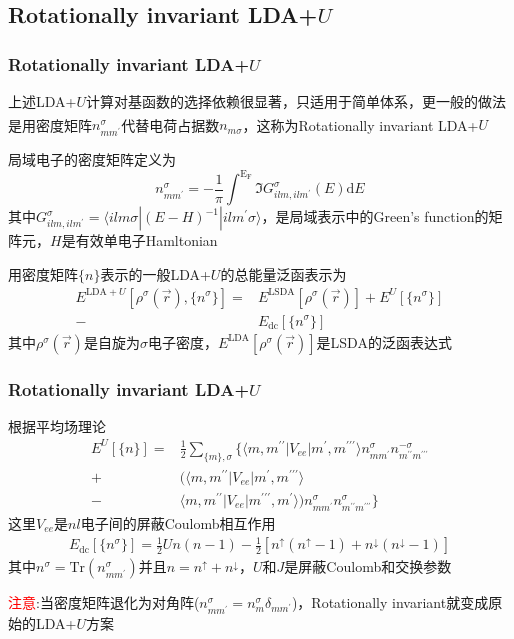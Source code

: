 \documentclass[cjk,slidestop,compress,mathserif,blue]{beamer}
\newcommand{\upcite}[1]{\hspace{0ex}\textsuperscript{\cite{#1}}} %
\begin{document}
\subsection{\rm{Rotationally invariant LDA+}$U$}
\frame
{
	\frametitle{\textrm{Rotationally invariant LDA+}$U$}
	上述\textrm{LDA}+$U$计算对基函数的选择依赖很显著，只适用于简单体系，更一般的做法是用密度矩阵$n_{mm^{\prime}}^{\sigma}$代替电荷占据数$n_{m\sigma}$，这称为\textrm{Rotationally invariant LDA}+$U$\upcite{PRB52-R5467_1995}

局域电子的密度矩阵定义为
\begin{displaymath}
	n_{mm^{\prime}}^{\sigma}=-\frac1{\pi}\int^{\mathrm{E_F}}\Im G_{ilm,ilm^{\prime}}^{\sigma}(E)\mathrm{d}E
\end{displaymath}
其中$G_{ilm,ilm^{\prime}}^{\sigma}=\langle ilm\sigma|(E-H)^{-1}|ilm^{\prime}\sigma\rangle$，是局域表示中的\textrm{Green's function}的矩阵元，$H$是有效单电子\textrm{Hamltonian}

用密度矩阵$\{n\}$表示的一般\textrm{LDA+}$U$的总能量泛函表示为
\begin{displaymath}
	\begin{aligned}
		E^{\mathrm{LDA}+U}[\rho^{\sigma}(\vec r),\{n^{\sigma}\}]=&E^{\mathrm{LSDA}}[\rho^{\sigma}(\vec r)]+E^U[\{n^{\sigma}\}]\\
		-&E_{\mathrm{dc}}[\{n^{\sigma}\}]
	\end{aligned}
\end{displaymath}
其中$\rho^{\sigma}(\vec r)$是自旋为$\sigma$电子密度，$E^{\mathrm{LDA}}[\rho^{\sigma}(\vec r)]$是\textrm{LSDA}的泛函表达式
}

\frame
{
	\frametitle{\textrm{Rotationally invariant LDA+}$U$}
	根据平均场理论
	\begin{displaymath}
		\begin{aligned}
			E^U[\{n\}]=&\frac12\sum_{\{m\},\sigma}\{\langle m,m^{\prime\prime}|V_{ee}|m^{\prime},m^{\prime\prime\prime}\rangle n_{mm^{\prime}}^{\sigma}n_{m^{\prime\prime}m^{\prime\prime\prime}}^{-\sigma}\\
			+&(\langle m,m^{\prime\prime}|V_{ee}|m^{\prime},m^{\prime\prime\prime}\rangle\\
			-&\langle m,m^{\prime\prime}|V_{ee}|m^{\prime\prime\prime},m^{\prime}\rangle)n_{mm^{\prime}}^{\sigma}n_{m^{\prime\prime}m^{\prime\prime\prime}}^{\sigma}\}
		\end{aligned}
	\end{displaymath}
	这里$V_{ee}$是$nl$电子间的屏蔽\textrm{Coulomb}相互作用
\begin{displaymath}
	\begin{aligned}
		E_{\mathrm{dc}}[\{n^{\sigma}\}]=\frac12Un(n-1)-\frac12[n^{\uparrow}(n^{\uparrow}-1)+n^{\downarrow}(n^{\downarrow}-1)]
	\end{aligned}
\end{displaymath}
其中$n^{\sigma}=\mathrm{Tr}(n_{mm^{\prime}}^{\sigma})$并且$n=n^{\uparrow}+n^{\downarrow}$，$U$和$J$是屏蔽\textrm{Coulomb}和交换参数

\textcolor{red}{注意}:当密度矩阵退化为对角阵($n_{mm^{\prime}}^{\sigma}=n_m^{\sigma}\delta_{mm^{\prime}}$)，\textrm{Rotationally invariant}就变成原始的\textrm{LDA}+$U$方案
}
\end{document}
